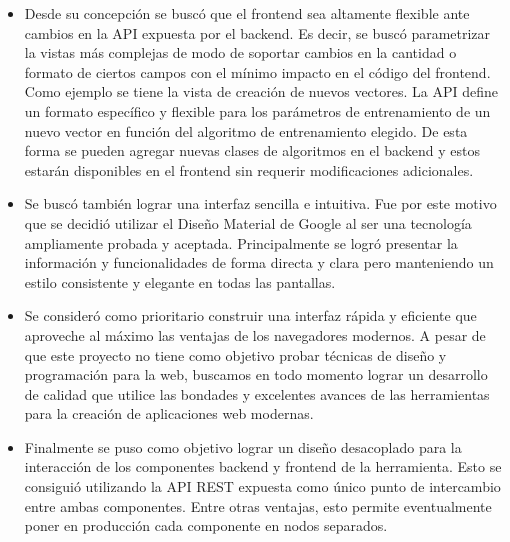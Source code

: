 \begin{itemize}

\item Desde su concepción se buscó que el frontend sea altamente flexible ante cambios en la API expuesta
por el backend. Es decir, se buscó parametrizar la vistas más complejas de modo de soportar cambios en la
cantidad o formato de ciertos campos con el mínimo impacto en el código del frontend. Como ejemplo se tiene
la vista de creación de nuevos vectores. La API define un formato específico y flexible para los parámetros
de entrenamiento de un nuevo vector en función del algoritmo de entrenamiento elegido. De esta forma se
pueden agregar nuevas clases de algoritmos en el backend y estos estarán disponibles en el frontend sin
requerir modificaciones adicionales.

\item Se buscó también lograr una interfaz sencilla e intuitiva. Fue por este motivo que se decidió
utilizar el Diseño Material de Google al ser una tecnología ampliamente probada y aceptada. Principalmente
se logró presentar la información y funcionalidades de forma directa y clara pero manteniendo un estilo
consistente y elegante en todas las pantallas.

\item Se consideró como prioritario construir una interfaz rápida y eficiente que aproveche al máximo las
ventajas de los navegadores modernos. A pesar de que este proyecto no tiene como objetivo probar técnicas
de diseño y programación para la web, buscamos en todo momento lograr un desarrollo de calidad que utilice
las bondades y excelentes avances de las herramientas para la creación de aplicaciones web modernas.

\item Finalmente se puso como objetivo lograr un diseño desacoplado para la interacción de los componentes
backend y frontend de la herramienta. Esto se consiguió utilizando la API REST expuesta como único punto de
intercambio entre ambas componentes. Entre otras ventajas, esto permite eventualmente poner en producción
cada componente en nodos separados.

\end{itemize}
